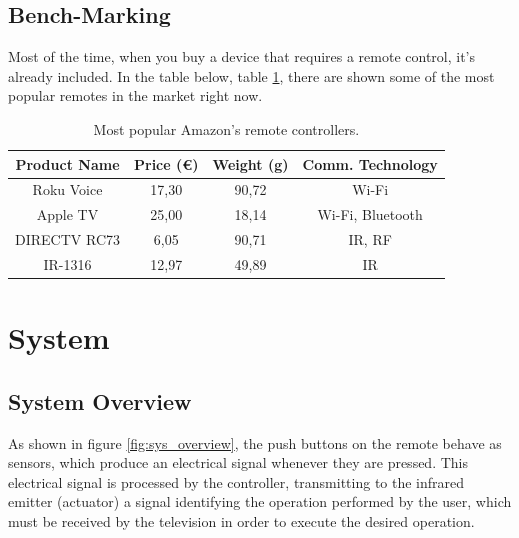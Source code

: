 \documentclass[12pt, letterpaper]{report}
\begin{document}
%
%
%
%

\subsection{Bench-Marking}
Most of the time, when you buy a device that requires a remote control, it's already included. In the table below, table \ref{table:popular_remotes}, there are shown some of the most popular remotes in the market right now.

\begin{table}[h]
    \centering
    \begin{tabular}{||c c c c||} 
    \hline
    Product Name & Price (€) & Weight (g) & Comm. Technology\\
    \hline\hline
    Roku Voice \cite{RokuVoiceRemote} & 17,30 & 90,72 & Wi-Fi\\ 
    Apple TV & 25,00 & 18,14 & Wi-Fi, Bluetooth \\
    DIRECTV RC73 & 6,05 & 90,71 & IR, RF \\
    IR-1316 & 12,97 & 49,89 & IR \\
    \hline
\end{tabular}
				
\caption{Most popular Amazon's remote controllers. }
\label{table:popular_remotes}
\end{table}
		
\section{System}
\subsection{System Overview}
As shown in figure \ref{fig:sys_overview}, the push buttons on the remote behave as sensors, which produce an electrical signal whenever they are pressed. This electrical signal is processed by the controller, transmitting to the infrared emitter (actuator) a signal identifying the operation performed by the user, which must be received by the television in order to execute the desired operation.
\end{document}
